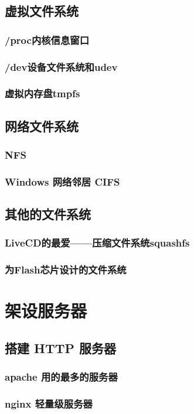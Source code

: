 \documentclass[amstex,twoside]{ctexbook}
\begin{document}
\section{  虚拟文件系统	}
\subsection{  /proc内核信息窗口}
\subsection{  /dev设备文件系统和udev}
\subsection{  虚拟内存盘tmpfs}
\section{  网络文件系统	}
\subsection{  NFS	}
\subsection{  Windows 网络邻居 CIFS	}
\section{  其他的文件系统	}
\subsection{  LiveCD的最爱——压缩文件系统squashfs}
\subsection{  为Flash芯片设计的文件系统}

\chapter{架设服务器}
\section{  搭建 HTTP 服务器}
\subsection{  apache 用的最多的服务器}
\subsection{ nginx 轻量级服务器}
\end{document}
